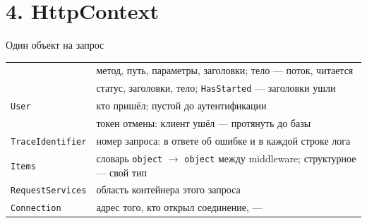 \documentclass[aspectratio=169,10pt,t]{beamer}
\begin{document}
\begin{frame}[plain]
\end{frame}

\section{4. HttpContext}

\begin{frame}[plain]
\end{frame}

\begin{frame}{Один объект на запрос}
  \slidetop

  {\renewcommand{\arraystretch}{1.28}\small
  \begin{tabular}{@{}L{3.7cm}L{9.1cm}@{}}
             & метод, путь, параметры, заголовки; тело --- поток,
      читается  \\
            & статус, заголовки, тело; \texttt{HasStarted} ---
      заголовки ушли \\
    \texttt{User}                 & кто пришёл; пустой до аутентификации \\
      & токен отмены: клиент ушёл --- протянуть до базы \\
    \texttt{TraceIdentifier}      & номер запроса: в ответе об ошибке и в каждой строке
      лога \\
    \texttt{Items}                & словарь \texttt{object} $\to$ \texttt{object} между
      middleware; структурное --- свой тип \\
    \texttt{RequestServices}      & область контейнера этого запроса \\
    \texttt{Connection}           & адрес того, кто открыл соединение, ---  \\
  \end{tabular}}
\end{frame}

\begin{frame}[plain]
\end{frame}
\end{document}
